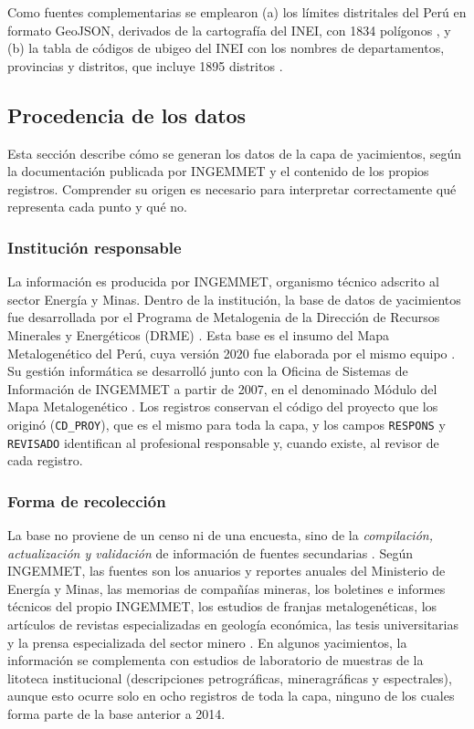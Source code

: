 \documentclass[man,12pt,a4paper,floatsintext,donotrepeattitle]{apa7}
\begin{document}
Como fuentes complementarias se emplearon (a) los límites distritales del Perú
en formato GeoJSON, derivados de la cartografía del INEI, con 1834 polígonos
\parencite{juaneladio-geojson}, y (b) la tabla de códigos de ubigeo del INEI con
los nombres de departamentos, provincias y distritos, que incluye 1895 distritos
\parencite{castagnetto-ubigeo}.

\subsection{Procedencia de los datos}

Esta sección describe cómo se generan los datos de la capa de yacimientos, según
la documentación publicada por INGEMMET y el contenido de los propios registros.
Comprender su origen es necesario para interpretar correctamente qué representa
cada punto y qué no.

\subsubsection{Institución responsable}

La información es producida por INGEMMET, organismo técnico adscrito al sector
Energía y Minas. Dentro de la institución, la base de datos de yacimientos fue
desarrollada por el Programa de Metalogenia de la Dirección de Recursos
Minerales y Energéticos (DRME) \parencite{huanacuni2010guia}. Esta base es el
insumo del Mapa Metalogenético del Perú, cuya versión 2020 fue elaborada por el
mismo equipo \parencite{acosta2020}. Su gestión informática se
desarrolló junto con la Oficina de Sistemas de Información de INGEMMET a partir
de 2007, en el denominado Módulo del Mapa Metalogenético
\parencite{huanacuni2010cpg}. Los registros conservan el código del proyecto que
los originó (\texttt{CD\_PROY}), que es el mismo para toda la capa, y los campos
\texttt{RESPONS} y \texttt{REVISADO} identifican al profesional responsable y,
cuando existe, al revisor de cada registro.

\subsubsection{Forma de recolección}

La base no proviene de un censo ni de una encuesta, sino de la
\textit{compilación, actualización y validación} de información de fuentes
secundarias \parencite{huanacuni2010cpg}. Según INGEMMET, las fuentes son los
anuarios y reportes anuales del Ministerio de Energía y Minas, las memorias de
compañías mineras, los boletines e informes técnicos del propio INGEMMET, los
estudios de franjas metalogenéticas, los artículos de revistas especializadas en
geología económica, las tesis universitarias y la prensa especializada del sector
minero \parencite{huanacuni2010guia,ingemmet2026servicio}. En algunos
yacimientos, la información se complementa con estudios de laboratorio de
muestras de la litoteca institucional (descripciones petrográficas,
mineragráficas y espectrales), aunque esto ocurre solo en ocho registros de toda
la capa, ninguno de los cuales forma parte de la base anterior a 2014.
\end{document}

